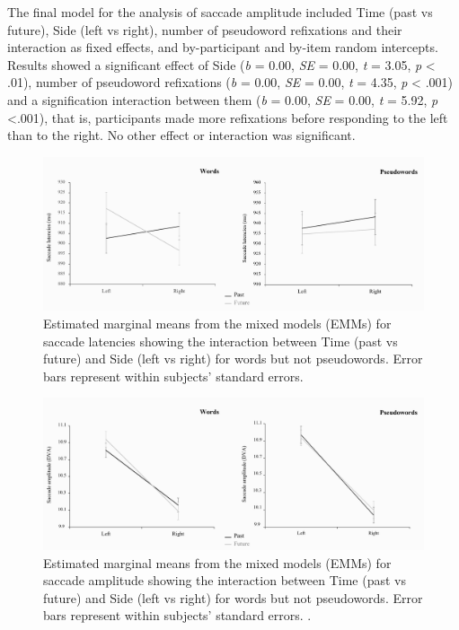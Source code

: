 \documentclass[
  a4paper,12pt,twoside,onecolumn,openright,final,oldfontcommands]{memoir}
\begin{document}
The final model for the analysis of saccade amplitude included Time (past vs future), Side (left vs right), number of pseudoword refixations and their interaction as fixed effects, and by-participant and by-item random intercepts. Results showed a significant effect of Side (\emph{b} = 0.00, \emph{SE} = 0.00, \emph{t} = 3.05, \emph{p} \textless{} .01), number of pseudoword refixations (\emph{b} = 0.00, \emph{SE} = 0.00, \emph{t} = 4.35, \emph{p} \textless{} .001) and a signification interaction between them (\emph{b} = 0.00, \emph{SE} = 0.00, \emph{t} = 5.92, \emph{p} \textless.001), that is, participants made more refixations before responding to the left than to the right. No other effect or interaction was significant.

\begin{figure}[htbp!]

{\centering \includegraphics[width=1\linewidth]{figures/chap-4-fig2} 

}

\caption{Estimated marginal means from the mixed models (EMMs) for saccade latencies showing the interaction between Time (past vs future) and Side (left vs right) for words but not pseudowords. Error bars represent within subjects’ standard errors.}\label{fig:chap-4-fig2}
\end{figure}

\begin{figure}[htbp!]

{\centering \includegraphics[width=1\linewidth]{figures/chap-4-fig3} 

}

\caption{Estimated marginal means from the mixed models (EMMs) for saccade amplitude showing the interaction between Time (past vs future) and Side (left vs right) for words but not pseudowords. Error bars represent within subjects’ standard errors. .}\label{fig:chap-4-fig3}
\end{figure}
\end{document}
